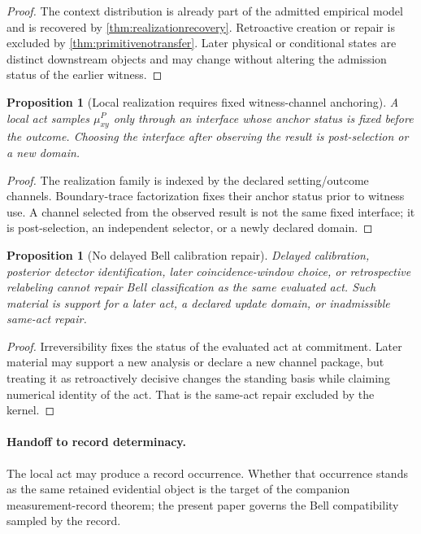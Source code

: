 \documentclass[11pt]{article}
\newtheorem{proposition}[theorem]{Proposition}
\theoremstyle{definition}
\begin{document}
\begin{proof}
The context distribution is already part of the admitted empirical model and is recovered by \cref{thm:realizationrecovery}. Retroactive creation or repair is excluded by \cref{thm:primitivenotransfer}. Later physical or conditional states are distinct downstream objects and may change without altering the admission status of the earlier witness.
\end{proof}

\begin{proposition}[Local realization requires fixed witness-channel anchoring]\label{prop:localchannel}
A local act samples $\mu^{P}_{xy}$ only through an interface whose anchor status is fixed before the outcome. Choosing the interface after observing the result is post-selection or a new domain.
\end{proposition}

\begin{proof}
The realization family is indexed by the declared setting/outcome channels. Boundary-trace factorization fixes their anchor status prior to witness use. A channel selected from the observed result is not the same fixed interface; it is post-selection, an independent selector, or a newly declared domain.
\end{proof}

\begin{proposition}[No delayed Bell calibration repair]\label{prop:nodelayedrepair}
Delayed calibration, posterior detector identification, later coincidence-window choice, or retrospective relabeling cannot repair Bell classification as the same evaluated act. Such material is support for a later act, a declared update domain, or inadmissible same-act repair.
\end{proposition}

\begin{proof}
Irreversibility fixes the status of the evaluated act at commitment. Later material may support a new analysis or declare a new channel package, but treating it as retroactively decisive changes the standing basis while claiming numerical identity of the act. That is the same-act repair excluded by the kernel.
\end{proof}

\paragraph{Handoff to record determinacy.}
The local act may produce a record occurrence. Whether that occurrence stands as the same retained evidential object is the target of the companion measurement-record theorem; the present paper governs the Bell compatibility sampled by the record.
\end{document}
